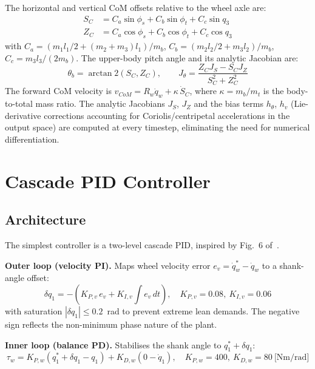 \documentclass[11pt,a4paper]{article}
\begin{document}
The horizontal and vertical CoM offsets relative to the wheel axle are:
\begin{align}
    S_C &= C_a\sin\phi_s + C_b\sin\phi_t + C_c\sin q_3 \\
    Z_C &= C_a\cos\phi_s + C_b\cos\phi_t + C_c\cos q_3
\end{align}
with $C_a = (m_1 l_1/2 + (m_2+m_3)l_1)/m_b$, $C_b = (m_2 l_2/2 + m_3 l_2)/m_b$,
$C_c = m_3 l_3/(2m_b)$.  The upper-body pitch angle and its analytic Jacobian are:
\begin{equation}
    \theta_b = \arctan2(S_C,Z_C), \qquad
    J_\theta = \frac{Z_C J_S - S_C J_Z}{S_C^2 + Z_C^2}
\end{equation}
The forward CoM velocity is $v_{CoM} = R_w\dot{q}_w + \kappa\,\dot{S}_C$, where
$\kappa = m_b/m_t$ is the body-to-total mass ratio.  The analytic Jacobians $J_S$, $J_Z$
and the bias terms $h_\theta$, $h_v$ (Lie-derivative corrections accounting for
Coriolis/centripetal accelerations in the output space) are computed at every timestep,
eliminating the need for numerical differentiation.


\section{Cascade PID Controller}
\label{sec:pid}

\subsection{Architecture}

The simplest controller is a two-level cascade PID, inspired by Fig.~6 of~\cite{cui2022}.

\textbf{Outer loop (velocity PI).}  Maps wheel velocity error
$e_v = \dot{q}_w^* - \dot{q}_w$ to a shank-angle offset:
\begin{equation}
    \delta q_1 = -(K_{P,v}\,e_v + K_{I,v}\!\int e_v\,dt),
    \quad K_{P,v} = 0.08,\ K_{I,v} = 0.06
\end{equation}
with saturation $|\delta q_1| \leq 0.2$~rad to prevent extreme lean demands.  The negative
sign reflects the non-minimum phase nature of the plant.

\textbf{Inner loop (balance PD).}  Stabilises the shank angle to $q_1^* + \delta q_1$:
\begin{equation}
    \tau_w = K_{P,w}(q_1^* + \delta q_1 - q_1) + K_{D,w}(0 - \dot{q}_1),
    \quad K_{P,w} = 400,\ K_{D,w} = 80\ \text{[Nm/rad]}
\end{equation}
\end{document}
